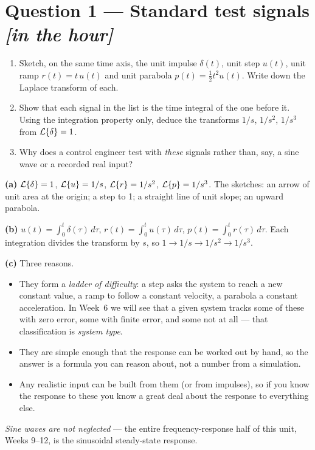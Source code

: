 \documentclass[11pt,a4paper]{article}
\newcommand{\inhour}{\hfill{\small\color{faccent}\itshape[in the hour]}}
\begin{document}
\section*{Question 1 --- Standard test signals \inhour}

\begin{enumerate}[label=(\alph*)]
\item Sketch, on the same time axis, the unit impulse $\delta(t)$, unit step
      $u(t)$, unit ramp $r(t)=t\,u(t)$ and unit parabola
      $p(t)=\tfrac{1}{2}t^{2}u(t)$. Write down the Laplace transform of each.

\item Show that each signal in the list is the time integral of the one before
      it. Using the integration property only, deduce the transforms
      $1/s$, $1/s^{2}$, $1/s^{3}$ from $\mathcal{L}\{\delta\}=1$.

\item Why does a control engineer test with \emph{these} signals rather than,
      say, a sine wave or a recorded real input?
\end{enumerate}

\begin{solution}
\textbf{(a)} $\mathcal{L}\{\delta\}=1$, $\mathcal{L}\{u\}=1/s$, $\mathcal{L}\{r\}=1/s^{2}$,
$\mathcal{L}\{p\}=1/s^{3}$. The sketches: an arrow of unit area at the origin; a step
to 1; a straight line of unit slope; an upward parabola.

\medskip
\textbf{(b)} $u(t)=\int_{0}^{t}\delta(\tau)\,d\tau$,
$r(t)=\int_{0}^{t}u(\tau)\,d\tau$, $p(t)=\int_{0}^{t}r(\tau)\,d\tau$. Each
integration divides the transform by $s$, so
$1\to 1/s\to 1/s^{2}\to 1/s^{3}$.

\medskip
\textbf{(c)} Three reasons.
\begin{itemize}
\item They form a \emph{ladder of difficulty}: a step asks the system to reach
      a new constant value, a ramp to follow a constant velocity, a parabola a
      constant acceleration. In Week~6 we will see that a given system tracks
      some of these with zero error, some with finite error, and some not at
      all --- that classification is \emph{system type}.
\item They are simple enough that the response can be worked out by hand, so
      the answer is a formula you can reason about, not a number from a
      simulation.
\item Any realistic input can be built from them (or from impulses), so if you
      know the response to these you know a great deal about the response to
      everything else.
\end{itemize}
\emph{Sine waves are not neglected} --- the entire frequency-response half of
this unit, Weeks 9--12, is the sinusoidal steady-state response.
\end{solution}
\end{document}
